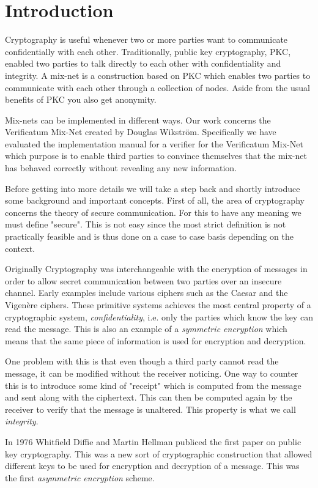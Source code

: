 \section{Introduction}

Cryptography is useful whenever two or more parties want to communicate confidentially with each other. Traditionally, public key cryptography, PKC, enabled two parties to talk directly to each other with confidentiality and integrity. A mix-net is a construction based on PKC which enables two parties to communicate with each other through a collection of nodes. Aside from the usual benefits of PKC you also get anonymity.

Mix-nets can be implemented in different ways. Our work concerns the Verificatum Mix-Net created by Douglas Wikström. Specifically we have evaluated the implementation manual for a verifier for the Verificatum Mix-Net which purpose is to enable third parties to convince themselves that the mix-net has behaved correctly without revealing any new information.

Before getting into more details we will take a step back and shortly introduce some background and important concepts. First of all, the area of cryptography concerns the theory of secure communication. For this to have any meaning we must define "secure". This is not easy since the most strict definition is not practically feasible and is thus done on a case to case basis depending on the context.

Originally Cryptography was interchangeable with the encryption of messages in order to allow secret communication between two parties over an insecure channel. Early examples include various ciphers such as the Caesar and the Vigenère ciphers. These primitive systems achieves the most central property of a cryptographic system, \emph{confidentiality}, i.e. only the parties which know the key can read the message. This is also an example of a \emph{symmetric encryption} which means that the same piece of information is used for encryption and decryption.

One problem with this is that even though a third party cannot read the message, it can be modified without the receiver noticing. One way to counter this is to introduce some kind of "receipt" which is computed from the message and sent along with the ciphertext. This can then be computed again by the receiver to verify that the message is unaltered. This property is what we call \emph{integrity}.

In 1976 Whitfield Diffie and Martin Hellman publiced the first paper on public key cryptography. This was a new sort of cryptographic construction that allowed different keys to be used for encryption and decryption of a message. This was the first \emph{asymmetric encryption} scheme.

